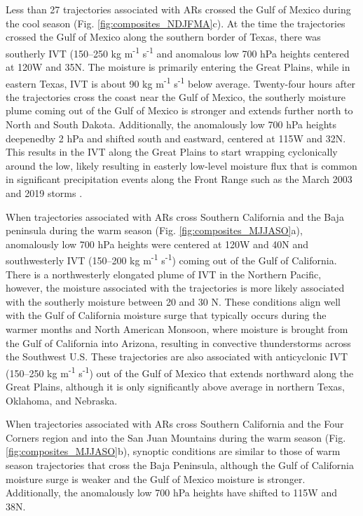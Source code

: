 \documentclass[draft]{agujournal2019}
\begin{document}
Less than 27 trajectories associated with ARs crossed the Gulf of Mexico during the cool season (Fig. \ref{fig:composites_NDJFMA}c). At the time the trajectories crossed the Gulf of Mexico along the southern border of Texas, there was southerly IVT (150--250 kg m\textsuperscript{-1} s\textsuperscript{-1} and anomalous low 700 hPa heights centered at 120\textdegree W and 35\textdegree N. The moisture is primarily entering the Great Plains, while in eastern Texas, IVT is about 90 kg m\textsuperscript{-1} s\textsuperscript{-1} below average. Twenty-four hours after the trajectories cross the coast near the Gulf of Mexico, the southerly moisture plume coming out of the Gulf of Mexico is stronger and extends further north to North and South Dakota. Additionally, the anomalously low 700 hPa heights deepenedby 2 hPa and shifted south and eastward, centered at 115\textdegree W and 32\textdegree N. This results in the IVT along the Great Plains to start wrapping cyclonically around the low, likely resulting in easterly low-level moisture flux that is common in significant precipitation events along the Front Range such as the March 2003 and 2019 storms \cite{Wesley2013Extreme2003, Zou2024A2019}. 

When trajectories associated with ARs cross Southern California and the Baja peninsula during the warm season (Fig. \ref{fig:composites_MJJASO}a), anomalously low 700 hPa heights were centered at 120\textdegree W and 40\textdegree N and southwesterly IVT (150--200 kg m\textsuperscript{-1} s\textsuperscript{-1}) coming out of the Gulf of California. There is a northwesterly elongated plume of IVT in the Northern Pacific, however, the moisture associated with the trajectories is more likely associated with the southerly moisture between 20 and 30 \textdegree N. These conditions align well with the Gulf of California moisture surge that typically occurs during the warmer months and North American Monsoon, where moisture is brought from the Gulf of California into Arizona, resulting in convective thunderstorms across the Southwest U.S. These trajectories are also associated with anticyclonic IVT (150--250 kg m\textsuperscript{-1} s\textsuperscript{-1}) out of the Gulf of Mexico that extends northward along the Great Plains, although it is only significantly above average in northern Texas, Oklahoma, and Nebraska. 

When trajectories associated with ARs cross Southern California and the Four Corners region and into the San Juan Mountains during the warm season (Fig. \ref{fig:composites_MJJASO}b), synoptic conditions are similar to those of warm season trajectories that cross the Baja Peninsula, although the Gulf of California moisture surge is weaker and the Gulf of Mexico moisture is stronger. Additionally, the anomalously low 700 hPa heights have shifted to 115\textdegree W and 38\textdegree N. 
\end{document}
